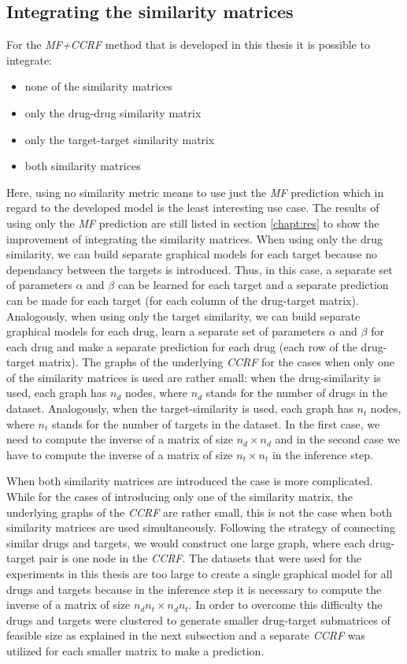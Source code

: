 \subsection{Integrating the similarity matrices}
For the \textit{MF+CCRF} method that is developed in this thesis it is possible to integrate:
\begin{itemize}
\item none of the similarity matrices
\item only the drug-drug similarity matrix
\item only the target-target similarity matrix
\item both similarity matrices
\end{itemize}
Here, using no similarity metric means to use just the \textit{MF} prediction which in regard to the developed model is the least interesting use case. The results of using only the \textit{MF} prediction are still listed in section \ref{chapt:res} to show the improvement of integrating the similarity matrices. When using only the drug similarity, we can build separate graphical models for each target because no dependancy between the targets is introduced. Thus, in this case, a separate set of parameters $\alpha$ and $\beta$ can be learned for each target and a separate prediction can be made for each target (for each column of the drug-target matrix). Analogously, when using only the target similarity, we can build separate graphical models for each drug, learn a separate set of parameters $\alpha$ and $\beta$ for each drug and make a separate prediction for each drug (each row of the drug-target matrix). The graphs of the underlying \textit{CCRF} for the cases when only one of the similarity matrices is used are rather small: when the drug-similarity is used, each graph has $n_d$ nodes, where $n_d$ stands for the number of drugs in the dataset. Analogously, when the target-similarity is used, each graph has $n_t$ nodes, where $n_t$ stands for the number of targets in the dataset. In the first case, we need to compute the inverse of a matrix of size $n_d \times n_d$ and in the second case we have to compute the inverse of a matrix of size $n_t \times n_t$ in the inference step.

When both similarity matrices are introduced the case is more complicated. While for the cases of introducing only one of the similarity matrix, the underlying graphs of the \textit{CCRF} are rather small, this is not the case when both similarity matrices are used simultaneously. Following the strategy of connecting similar drugs and targets, we would construct one large graph, where each drug-target pair is one node in the \textit{CCRF}. The datasets that were used for the experiments in this thesis are too large to create a single graphical model for all drugs and targets because in the inference step it is necessary to compute the inverse of a matrix of size $n_dn_t \times n_dn_t$. In order to overcome this difficulty the drugs and targets were clustered to generate smaller drug-target submatrices of feasible size as explained in the next subsection and a separate \textit{CCRF} was utilized for each smaller matrix to make a prediction.

